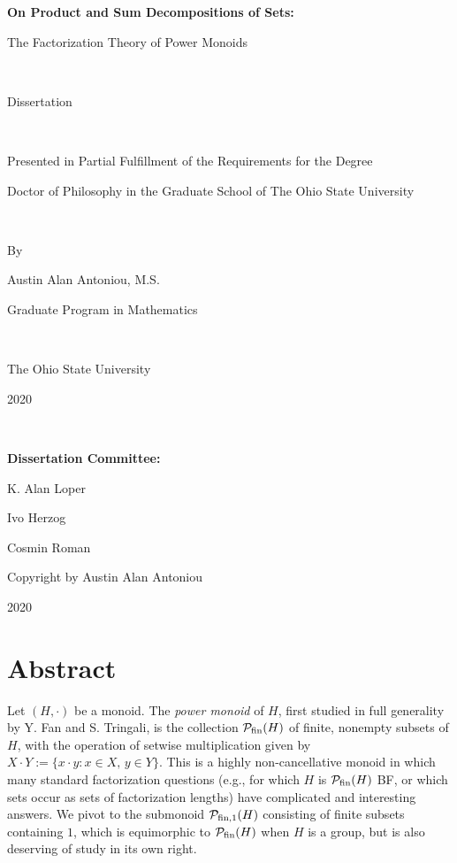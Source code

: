 \frontmatter

\begin{titlepage}
\hspace{0pt}
\vfill
\begin{center}
	{\LARGE \bf On Product and Sum Decompositions of Sets: \\ \vspace{3mm}
		
		The Factorization Theory of Power Monoids}

\

	Dissertation

\
	
	Presented in Partial Fulfillment of the Requirements 
	for the Degree 
	
	Doctor of Philosophy 
	in the Graduate School of The Ohio State University

\
		
	By 
	
	{\large Austin Alan Antoniou, M.S. 
	
	Graduate Program in Mathematics}

\
	
	The Ohio State University
	
	2020

\

	{\large {\bf Dissertation Committee:}
	
	K. Alan Loper
	
	Ivo Herzog
	
	Cosmin Roman}
\end{center}
\vfill

\end{titlepage}


\hspace{0pt}
\vfill
\begin{center}
{\Large Copyright by Austin Alan Antoniou

2020}
\end{center}
\setcounter{page}{1}
\vfill
\thispagestyle{empty}
\chapter{Abstract}
Let $(H,\cdot)$ be a monoid.
The \textit{power monoid} of $H$, first studied in full generality by Y. Fan and S. Tringali, is the collection $\mathcal{P}_{\textrm{fin}}(H)$ of finite, nonempty subsets of $H$, with the operation of setwise multiplication given by $X\cdot Y := \{x\cdot y: x\in X, \, y\in Y\}$.
This is a highly non-cancellative monoid in which many standard factorization questions (e.g., for which $H$ is $\mathcal{P}_{\textrm{fin}}(H)$ BF, or which sets occur as sets of factorization lengths) have complicated and interesting answers.
We pivot to the submonoid $\mathcal{P}_{\textrm{fin}, 1}(H)$ consisting of finite subsets containing $1$, which is equimorphic to $\mathcal{P}_{\textrm{fin}}(H)$ when $H$ is a group, but is also deserving of study in its own right.

